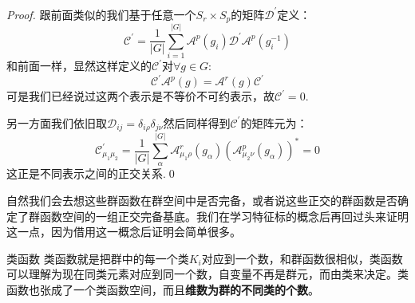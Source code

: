 \begin{proof}
	跟前面类似的我们基于任意一个$S_r\times S_p$的矩阵$\mathcal{D}^\prime$定义：
	\begin{equation*}
		\mathcal{C}^\prime=\frac{1}{|G|}\sum_{i=1}^{|G|}\mathcal{A}^p(g_i)\mathcal{D}^\prime\mathcal{A}^p(g_i^{-1})
	\end{equation*}
	和前面一样，显然这样定义的$\mathcal{C}^\prime$对$\forall g\in G$:
	\[\mathcal{C}^\prime\mathcal{A}^p(g)=\mathcal{A}^r(g)\mathcal{C}^\prime\]
	可是我们已经说过这两个表示是不等价不可约表示，故$\mathcal{C}^\prime=0$.
	
	另一方面我们依旧取$\mathcal{D}_{ij}=\delta_{i\rho}\delta_{j\nu}$然后同样得到$\mathcal{C}^\prime$的矩阵元为：
	\begin{equation}
		\mathcal{C}^\prime_{\mu_1\mu_2}=\frac{1}{|G|}\sum_{\alpha}^{|G|}\mathcal{A}_{\mu_1\rho}^r(g_\alpha)(\mathcal{A}_{\mu_2\nu}^p(g_\alpha))^*=0
	\end{equation}
	这正是不同表示之间的正交关系.\qed
\end{proof}

自然我们会去想这些群函数在群空间中是否完备，或者说这些正交的群函数是否确定了群函数空间的一组正交完备基底。我们在学习特征标的概念后再回过头来证明这一点，因为借用这一概念后证明会简单很多。
\begin{define}{类函数}
	类函数就是把群中的每一个类$K_i$对应到一个数，和群函数很相似，类函数可以理解为现在同类元素对应到同一个数，自变量不再是群元，而由类来决定。类函数也张成了一个类函数空间，而且\textbf{维数为群的不同类的个数}。
\end{define}


